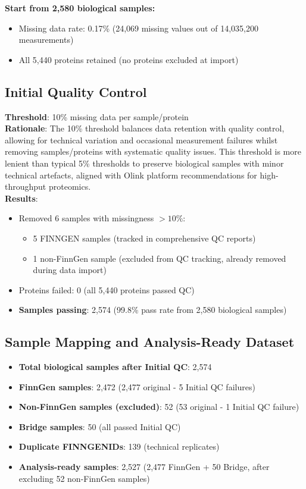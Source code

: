\documentclass[11pt,a4paper]{article}
\begin{document}
\textbf{Start from 2,580 biological samples:}
\begin{itemize}
\item Missing data rate: 0.17\% (24,069 missing values out of 14,035,200 measurements)
\item All 5,440 proteins retained (no proteins excluded at import)
\end{itemize}

\subsection{Initial Quality Control}
\textbf{Threshold}: 10\% missing data per sample/protein\\
\textbf{Rationale}: The 10\% threshold balances data retention with quality control, allowing for technical variation and occasional measurement failures whilst removing samples/proteins with systematic quality issues. This threshold is more lenient than typical 5\% thresholds to preserve biological samples with minor technical artefacts, aligned with Olink platform recommendations for high-throughput proteomics.\\

\textbf{Results}:
\begin{itemize}
\item Removed 6 samples with missingness $> 10\%$:
  \begin{itemize}
    \item 5 FINNGEN samples (tracked in comprehensive QC reports)
    \item 1 non-FinnGen sample (excluded from QC tracking, already removed during data import)
  \end{itemize}
\item Proteins failed: 0 (all 5,440 proteins passed QC)
\item \textbf{Samples passing}: 2,574 (99.8\% pass rate from 2,580 biological samples)
\end{itemize}

\subsection{Sample Mapping and Analysis-Ready Dataset}
\begin{itemize}
\item \textbf{Total biological samples after Initial QC}: 2,574
\item \textbf{FinnGen samples}: 2,472 (2,477 original - 5 Initial QC failures)
\item \textbf{Non-FinnGen samples (excluded)}: 52 (53 original - 1 Initial QC failure)
\item \textbf{Bridge samples}: 50 (all passed Initial QC)
\item \textbf{Duplicate FINNGENIDs}: 139 (technical replicates)
\item \textbf{Analysis-ready samples}: 2,527 (2,477 FinnGen + 50 Bridge, after excluding 52 non-FinnGen samples)
\end{itemize}
\end{document}
